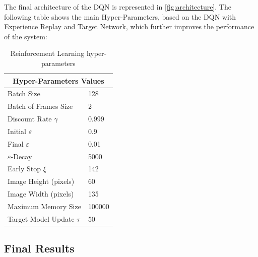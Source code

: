 \documentclass[11pt]{article}
\begin{document}
The final architecture of the DQN is represented in \ref{fig:architecture}. The following table shows the main Hyper-Parameters, based on the DQN with Experience Replay and Target Network, which further improves the performance of the system:

\begin{table}[h!]
	\centering
	\begin{tabular}{ |p{6cm}|p{6cm}| }
		\hline
		\multicolumn{2}{|c|}{Hyper-Parameters Values} \\
		\hline
		Batch Size & 128 \\
		\hline
		Batch of Frames Size & 2 \\
		\hline
		Discount Rate $\gamma$  & 0.999 \\
		\hline
		Initial $\varepsilon$ & 0.9 \\
		\hline
		Final $\varepsilon$ & 0.01 \\
		\hline
		$\varepsilon$-Decay & 5000 \\
		\hline
		Early Stop $\xi$ & 142 \\
		\hline
		Image Height (pixels) & 60 \\
		\hline
		Image Width (pixels) & 135 \\
		\hline
		Maximum Memory Size  & 100000 \\
		\hline
       	Target Model Update $\tau$ & 50  \\
        \hline

	\end{tabular}
	\label{table:hyperParameters}
	\caption{Reinforcement Learning hyper-parameters}
\end{table}
 

\subsection{Final Results}
\end{document}

